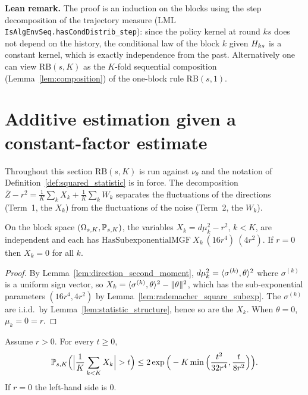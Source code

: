 \textbf{Lean remark.} The proof is an induction on the blocks using the step decomposition
of the trajectory measure (LML \texttt{IsAlgEnvSeq.hasCondDistrib\_step}): since the policy
kernel at round $ks$ does not depend on the history, the conditional law of the block
$k$ given $H_{ks}$ is a constant kernel, which is exactly independence from the past.
Alternatively one can view $\mathrm{RB}(s,K)$ as the $K$-fold sequential composition
(Lemma~\ref{lem:composition}) of the one-block rule $\mathrm{RB}(s,1)$.

\section{Additive estimation given a constant-factor estimate}
\label{sec:norm_additive}

Throughout this section $\mathrm{RB}(s,K)$ is run against $\nu_\theta$ and the notation of
Definition~\ref{def:squared_statistic} is in force. The decomposition
$\bar Z - r^2 = \frac1K\sum_k X_k + \frac1K\sum_k W_k$ separates the fluctuations of the
directions (Term~1, the $X_k$) from the fluctuations of the noise (Term~2, the $W_k$).

\begin{lemma}\label{lem:term1_subexp}
\leanok
{}
On the block space $(\Omega_{s,K}, \mathbb{P}_{s,K})$, the variables $X_k = d\mu_k^2 - r^2$,
$k < K$, are independent and each has $\mathrm{HasSubexponentialMGF}\ X_k\ (16 r^4)\ (4r^2)$.
If $r = 0$ then $X_k = 0$ for all $k$.
\end{lemma}

\begin{proof}
\leanok
{}
By Lemma~\ref{lem:direction_second_moment}, $d\mu_k^2 = \langle \sigma^{(k)}, \theta \rangle^2$ where
$\sigma^{(k)}$ is a uniform sign vector, so $X_k = \langle \sigma^{(k)}, \theta \rangle^2 - \lVert \theta \rVert^2$,
which has the sub-exponential parameters $(16r^4, 4r^2)$ by
Lemma~\ref{lem:rademacher_square_subexp}. The $\sigma^{(k)}$ are i.i.d.\ by
Lemma~\ref{lem:statistic_structure}, hence so are the $X_k$. When $\theta = 0$,
$\mu_k = 0 = r$.
\end{proof}

\begin{lemma}\label{lem:term1_bound}
\leanok
{}
Assume $r > 0$. For every $t \ge 0$,
\[
  \mathbb{P}_{s,K}\Big( \Big| \frac1K\sum_{k<K} X_k \Big| > t \Big)
  \le 2\exp\Big( -K \min\Big( \frac{t^2}{32 r^4}, \frac{t}{8 r^2} \Big) \Big).
\]
If $r = 0$ the left-hand side is $0$.
\end{lemma}

